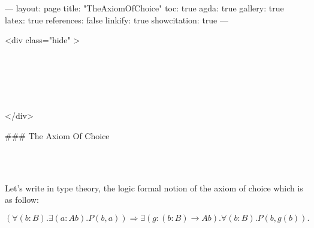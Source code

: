 ---
layout: page
title: "TheAxiomOfChoice"
toc: true
agda: true
gallery: true
latex: true
references: false
linkify: true
showcitation: true
---

<div class="hide" >
\begin{code}%
\>[0]\AgdaSymbol{\{-\#}\AgdaSpace{}%
\AgdaSpace{}%
\AgdaSpace{}%
\AgdaSymbol{\#-\}}\<%
\\
\>[0]\AgdaSpace{}%
\AgdaSpace{}%
\<%
\\
%
\\[\AgdaEmptyExtraSkip]%
\>[0]\AgdaSpace{}%
\AgdaSpace{}%
\<%
\\
\>[0]\AgdaSpace{}%
\AgdaSpace{}%
\<%
\end{code}
</div>

### The Axiom Of Choice

\begin{code}%
\>[0]\<%
\\
\>[0][@{}l@{\AgdaIndent{0}}]%
\>[2]\<%
\\
%
\>[2]\<%
\end{code}

Let's write in type theory, the logic formal
notion of the axiom of choice which is as follow:

$$
  (∀ (b : B) . ∃ (a : A b) . P(b,a))
  ⇒ ∃ (g : (b : B) → A b) . ∀ (b : B) . P (b, g(b)) .
$$

